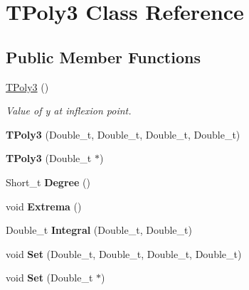 \hypertarget{classTPoly3}{
\section{TPoly3 Class Reference}
\label{classTPoly3}
}
\subsection*{Public Member Functions}
\begin{DoxyCompactItemize}
\item 
\hypertarget{classTPoly3_a5b612783e0bb44b124e0098aee6a88f0}{
\hyperlink{classTPoly3_a5b612783e0bb44b124e0098aee6a88f0}{TPoly3} ()}
\label{classTPoly3_a5b612783e0bb44b124e0098aee6a88f0}

\begin{DoxyCompactList}\small\item\em Value of y at inflexion point. \item\end{DoxyCompactList}\item 
\hypertarget{classTPoly3_a028a5983a69bf4026b933242c7462194}{
{\bfseries TPoly3} (Double\_\-t, Double\_\-t, Double\_\-t, Double\_\-t)}
\label{classTPoly3_a028a5983a69bf4026b933242c7462194}

\item 
\hypertarget{classTPoly3_ac7e8ffb5811952361e398917a009a6ea}{
{\bfseries TPoly3} (Double\_\-t $\ast$)}
\label{classTPoly3_ac7e8ffb5811952361e398917a009a6ea}

\item 
\hypertarget{classTPoly3_a790244de7f8e57fd6646e782a97007f0}{
Short\_\-t {\bfseries Degree} ()}
\label{classTPoly3_a790244de7f8e57fd6646e782a97007f0}

\item 
\hypertarget{classTPoly3_a4f3c7938a29799215b68895eb4016fd5}{
void {\bfseries Extrema} ()}
\label{classTPoly3_a4f3c7938a29799215b68895eb4016fd5}

\item 
\hypertarget{classTPoly3_a411197d8138b879f70960da319d96e02}{
Double\_\-t {\bfseries Integral} (Double\_\-t, Double\_\-t)}
\label{classTPoly3_a411197d8138b879f70960da319d96e02}

\item 
\hypertarget{classTPoly3_adc456c40946d54f46a7e31f356fcf67e}{
void {\bfseries Set} (Double\_\-t, Double\_\-t, Double\_\-t, Double\_\-t)}
\label{classTPoly3_adc456c40946d54f46a7e31f356fcf67e}

\item 
\hypertarget{classTPoly3_a09880064095a49b705774d97eb630e30}{
void {\bfseries Set} (Double\_\-t $\ast$)}
\label{classTPoly3_a09880064095a49b705774d97eb630e30}


\end{DoxyCompactItemize}
